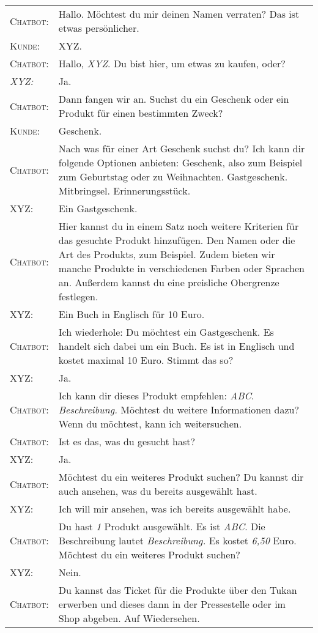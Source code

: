 \begin{center}
\begin{tabular}{p{}p{}}
	\textsc{Chatbot:} & Hallo. Möchtest du mir deinen Namen verraten? Das ist etwas persönlicher. \\
	\textsc{Kunde:} & XYZ.\\
	\textsc{Chatbot:} & Hallo, \textit{XYZ}. Du bist hier, um etwas zu kaufen, oder? \\
	\textit{XYZ:} & Ja. \\
	\textsc{Chatbot:} & Dann fangen wir an. Suchst du ein Geschenk oder ein Produkt für einen bestimmten Zweck? \\
	\textsc{Kunde:} & Geschenk.\\
	\textsc{Chatbot:} & Nach was für einer Art Geschenk suchst du? Ich kann dir folgende Optionen anbieten: Geschenk, also zum Beispiel zum Geburtstag oder zu Weihnachten. Gastgeschenk. Mitbringsel. Erinnerungsstück.\\
	\textsc{XYZ:} & Ein Gastgeschenk. \\
	\textsc{Chatbot:} & Hier kannst du in einem Satz noch weitere Kriterien für das gesuchte Produkt hinzufügen. Den Namen oder die Art des Produkts, zum Beispiel. Zudem bieten wir manche Produkte in verschiedenen Farben oder Sprachen an. Außerdem kannst du eine preisliche Obergrenze festlegen.\\
	\textsc{XYZ:} & Ein Buch in Englisch für 10 Euro.\\
	\textsc{Chatbot:} & Ich wiederhole: Du möchtest ein Gastgeschenk. Es handelt sich dabei um ein Buch. Es ist in Englisch und kostet maximal 10 Euro. Stimmt das so? \\
	\textsc{XYZ:} & Ja. \\
	\textsc{Chatbot:} & Ich kann dir dieses Produkt empfehlen: \textit{ABC}. \textit{Beschreibung.} Möchtest du weitere Informationen dazu? Wenn du möchtest, kann ich weitersuchen. \\
	\textsc{Chatbot:} & Ist es das, was du gesucht hast?\\
	\textsc{XYZ:} & Ja. \\
	\textsc{Chatbot:} & Möchtest du ein weiteres Produkt suchen? Du kannst dir auch ansehen, was du bereits ausgewählt hast. \\
	\textsc{XYZ:} & Ich will mir ansehen, was ich bereits ausgewählt habe. \\
	\textsc{Chatbot:} & Du hast \textit{1} Produkt ausgewählt. Es ist \textit{ABC}. Die Beschreibung lautet \textit{Beschreibung.} Es kostet \textit{6,50} Euro. Möchtest du ein weiteres Produkt suchen? \\
	\textsc{XYZ:} & Nein.\\
	\textsc{Chatbot:} & Du kannst das Ticket für die Produkte über den Tukan erwerben und dieses dann in der Pressestelle oder im Shop abgeben. Auf Wiedersehen.\\
	\end{tabular}
\end{center}
\vspace{12pt}


